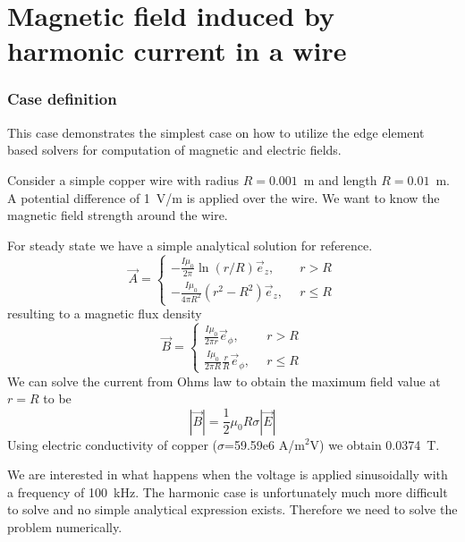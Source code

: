 \chapter{Magnetic field induced by harmonic current in a wire}



\subsection*{Case definition}

This case demonstrates the simplest case on how to utilize the edge element based solvers
for computation of magnetic and electric fields.

Consider a simple copper wire with radius $R=0.001$~m and length $R=0.01$~m. A potential difference of 1~V/m is applied
over the wire. We want to know the magnetic field strength around the wire.  

For steady state we have a simple analytical solution for reference.
\begin{equation}
\vec{A} = \left \{
\begin{array}{ll}
  -\frac{I\mu_0}{2\pi}\ln (r/R) \vec{e}_z, & \, \, \, r > R \\
  -\frac{I\mu_0}{4\pi R^2 } (r^2 - R^2) \vec{e}_z, & \, \, \, r \leq R 
\end{array}  
\right .
\end{equation}
resulting to a magnetic flux density
\begin{equation}
\vec{B} = \left \{
\begin{array}{ll}
  \frac{I\mu_0}{2\pi r}\vec{e}_\phi, & \, \, \, r > R \\
  \frac{I\mu_0}{2\pi R}\frac{r}{R}\vec{e}_\phi, & \, \, \, r \leq R 
\end{array}  
\right .
\end{equation}
We can solve the current from Ohms law to obtain the maximum field value at $r=R$ to be
\begin{equation}
  | \vec{B} | = \frac{1}{2} \mu_0 R \sigma | \vec{E} |   
\end{equation}
Using electric conductivity of copper ($\sigma$=59.59e6 A/m$^2$V) we obtain 0.0374~T.

We are interested in what happens when the voltage is applied sinusoidally with a frequency of 100~kHz.
The harmonic case is unfortunately much more difficult to solve and no simple analytical expression exists.
Therefore we need to solve the problem numerically. 



